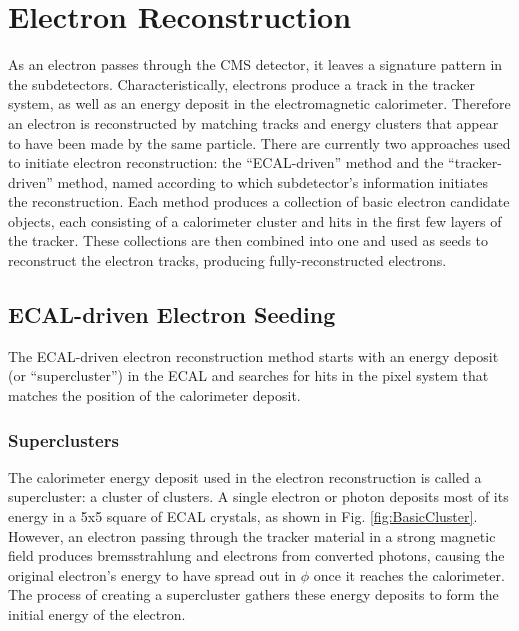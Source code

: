 \section{Electron Reconstruction}
\label{evReco:elec}
As an electron 
passes through the CMS detector, 
it leaves a signature pattern in the subdetectors.  
Characteristically, electrons produce a track 
in the tracker system, 
as well as an energy deposit in the 
electromagnetic calorimeter.  
Therefore an electron is reconstructed 
by matching tracks and energy clusters 
that appear to have been made by the same particle.  
There are currently two approaches used to 
initiate electron reconstruction: 
the ``ECAL-driven'' method and 
the ``tracker-driven'' method, 
named according to which subdetector's 
information initiates the reconstruction.  
Each method produces a collection of 
basic electron candidate objects, 
each consisting of a calorimeter cluster 
and hits in the first few layers of the tracker.  
These collections are then combined into one 
and used as seeds to reconstruct the electron tracks, 
producing fully-reconstructed electrons.  

\subsection{ECAL-driven Electron Seeding}
\label{evReco:ecalDrv}

The ECAL-driven electron reconstruction method 
starts with an energy deposit (or ``supercluster'') 
in the ECAL 
and searches for hits in the 
pixel system that matches the 
position of the calorimeter deposit.  

\subsubsection{Superclusters}
\label{evReco:SC}

The calorimeter energy deposit used in the electron 
reconstruction is called a supercluster: 
a cluster of clusters.  
A single electron or photon deposits most of its energy 
in a 5x5 square of ECAL crystals, 
as shown in Fig. \ref{fig:BasicCluster}.  
However, an electron passing through the tracker material 
in a strong magnetic field produces 
bremsstrahlung and electrons from converted photons, 
causing the original electron's energy to 
have spread out in $\phi$ once it reaches the calorimeter.  
The process of creating a supercluster gathers these 
energy deposits to form the initial energy of the electron.  

